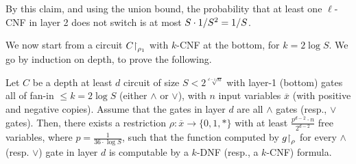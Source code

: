 By this claim, and using the union bound, the probability that at least one $\ell$-CNF in layer 2 does not switch is at most $ S\cdot 1/S^2 = 1/S$.



We now start from a circuit $C{\upharpoonright}_{\rho_1}$ with $k$-CNF at the bottom, for $k = 2 \log S$.
We go by induction on depth, to prove the following.


\begin{tcolorbox}[colframe=white, colback=red!11, boxrule=0mm, sharp corners]
\begin{lemma}\label{lem:induction-switch}
Let $C$ be a depth at least $d$ circuit of size 
$S<
2^{
\sqrt[d-1]{n}
}$ 
with layer-1 (bottom) gates all of fan-in  $ \leq k=2 \log S$ (either  $\land$ or $\lor$),
with $n$ input variables  
$\overline x$ (with positive and negative copies). Assume that the gates in layer $d$ are all $\land$ gates (resp., $\lor$ gates). 
Then, there exists a restriction $\rho: \overline {x} \rightarrow\{0,1, *\} $ with at least  $\frac{p^{d-2} \cdot n}{2^{d-2}} $ free variables, where $ p=\frac{1}{36 \cdot \log S}$, such that  
the function computed by $g{\upharpoonright}_{\rho}$ for every $\land$ (resp. $\lor$) gate in layer $d$ is computable by a $k$-DNF (resp., a $k$-CNF) formula. 
\end{lemma} 
\end{tcolorbox}

